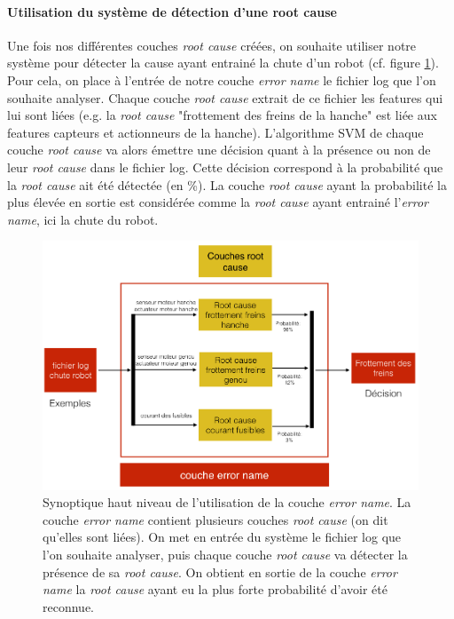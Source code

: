 \paragraph{Utilisation du système de détection d'une root cause}
Une fois nos différentes couches \emph{root cause} créées, on souhaite utiliser notre système pour détecter la cause ayant entrainé la chute d'un robot (cf. figure \ref{fig:utilisation de la couche error name}). Pour cela, on place à l'entrée de notre couche \emph{error name} le fichier log que l'on souhaite analyser. Chaque couche \emph{root cause} extrait de ce fichier les features qui lui sont liées (e.g. la \emph{root cause} "frottement des freins de la hanche" est liée aux features capteurs et actionneurs de la hanche). L'algorithme SVM de chaque couche \emph{root cause} va alors émettre une décision quant à la présence ou non de leur \emph{root cause} dans le fichier log. Cette décision correspond à la probabilité que la \emph{ root cause} ait été détectée (en \%). La couche \emph{root cause} ayant la probabilité la plus élevée en sortie est considérée comme la \emph{root cause} ayant entrainé l'\emph{error name},  ici la chute du robot.

\begin{figure}[h]
	\centering\includegraphics[width=15cm]{images/synoptique_error.png}
	\caption[Utilisation de la couche error name]{Synoptique haut niveau de l'utilisation de la couche \emph{error name}. La couche \emph{error name} contient plusieurs couches \emph{root cause} (on dit qu'elles sont liées). On met en entrée du système le fichier log que l'on souhaite analyser, puis chaque couche \emph{root cause} va détecter la présence de sa \emph{root cause}. On obtient en sortie de la couche \emph{error name} la \emph{root cause}  ayant eu la plus forte probabilité d'avoir été reconnue.}
	\label{fig:utilisation de la couche error name}
\end{figure}

